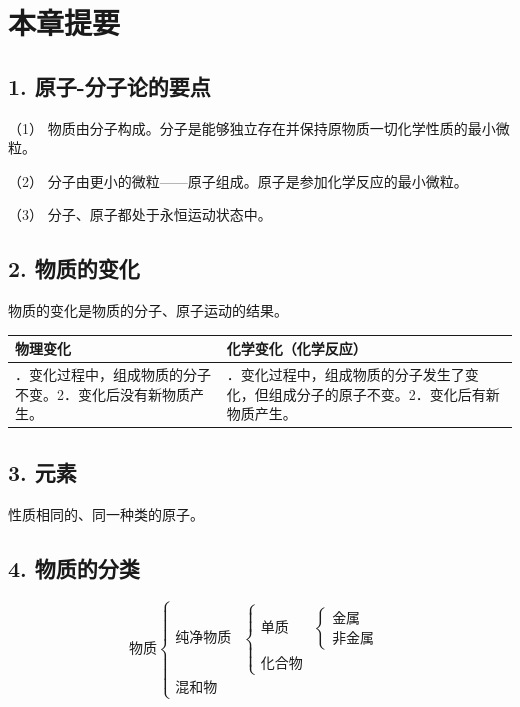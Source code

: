 \section{本章提要}

\subsection{1. 原子-分子论的要点}

（1）
物质由分子构成。分子是能够独立存在并保持原物质一切化学性质的最小微粒。

（2） 分子由更小的微粒------原子组成。原子是参加化学反应的最小微粒。

（3） 分子、原子都处于永恒运动状态中。

\subsection{2. 物质的变化}

物质的变化是物质的分子、原子运动的结果。

{\def\LTcaptype{none} %
\begin{longtable}[]{@{}
  >{\raggedright\arraybackslash}p{}
  >{\raggedright\arraybackslash}p{}@{}}
\toprule\noalign{}
\begin{minipage}[b]{\linewidth}\raggedright
物理变化
\end{minipage} & \begin{minipage}[b]{\linewidth}\raggedright
化学变化（化学反应）
\end{minipage} \\
\midrule\noalign{}
\endhead
\bottomrule\noalign{}
\endlastfoot
1．变化过程中，组成物质的分子不变。2．变化后没有新物质产生。 &
1．变化过程中，组成物质的分子发生了变化，但组成分子的原子不变。2．变化后有新物质产生。 \\
\end{longtable}
}

\subsection{3. 元素}

性质相同的、同一种类的原子。

\subsection{4. 物质的分类}

\[
\text{物质}\left\{\begin{array}{ll}
\text{纯净物质} &
\left\{\begin{array}{ll}
\text{单质} & \left\{\begin{array}{l}\text{金属}\\\text{非金属}\end{array}\right.\\
\text{化合物}
\end{array}\right.\\
\text{混和物}
\end{array}\right.
\]

